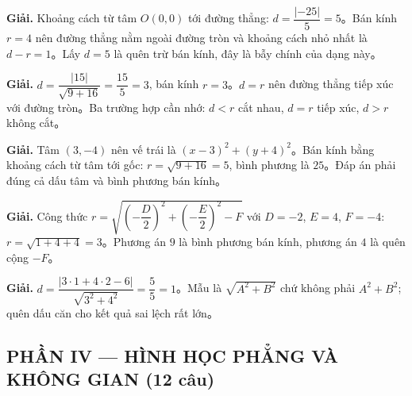 \documentclass[11pt, a4paper]{article}
\begin{document}
\vspace{0.3cm}
\begin{dapan}[32 — Đáp án D]

\textbf{Giải.} Khoảng cách từ tâm $O(0,0)$ tới đường thẳng: $d=\dfrac{\lvert-25\rvert}{5}=5$。Bán kính $r=4$ nên đường thẳng nằm ngoài đường tròn và khoảng cách nhỏ nhất là $d-r=1$。Lấy $d=5$ là quên trừ bán kính, đây là bẫy chính của dạng này。


\end{dapan}
\vspace{0.3cm}
\begin{dapan}[33 — Đáp án B]

\textbf{Giải.} $d=\dfrac{\lvert15\rvert}{\sqrt{9+16}}=\dfrac{15}{5}=3$, bán kính $r=3$。$d=r$ nên đường thẳng tiếp xúc với đường tròn。Ba trường hợp cần nhớ: $d<r$ cắt nhau, $d=r$ tiếp xúc, $d>r$ không cắt。


\end{dapan}
\vspace{0.3cm}
\begin{dapan}[34 — Đáp án C]

\textbf{Giải.} Tâm $(3,-4)$ nên vế trái là $(x-3)^2+(y+4)^2$。Bán kính bằng khoảng cách từ tâm tới gốc: $r=\sqrt{9+16}=5$, bình phương là $25$。Đáp án phải đúng cả dấu tâm và bình phương bán kính。


\end{dapan}
\vspace{0.3cm}
\begin{dapan}[35 — Đáp án B]

\textbf{Giải.} Công thức $r=\sqrt{\left(-\dfrac{D}{2}\right)^2+\left(-\dfrac{E}{2}\right)^2-F}$ với $D=-2$, $E=4$, $F=-4$: $r=\sqrt{1+4+4}=3$。Phương án $9$ là bình phương bán kính, phương án $4$ là quên cộng $-F$。


\end{dapan}
\vspace{0.3cm}
\begin{dapan}[36 — Đáp án A]

\textbf{Giải.} $d=\dfrac{\lvert3\cdot1+4\cdot2-6\rvert}{\sqrt{3^2+4^2}}=\dfrac{5}{5}=1$。Mẫu là $\sqrt{A^2+B^2}$ chứ không phải $A^2+B^2$; quên dấu căn cho kết quả sai lệch rất lớn。

\subsection{PHẦN IV — HÌNH HỌC PHẲNG VÀ KHÔNG GIAN (12 câu)}


\end{dapan}
\end{document}
